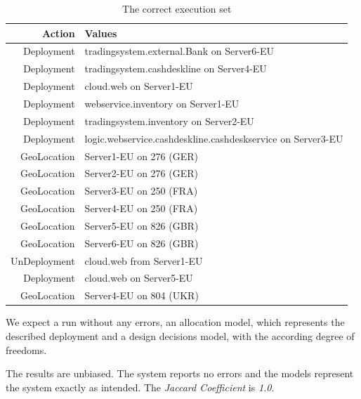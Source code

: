 \begin{table}[h]
	\centering
	\begin{tabular}{r | l}
		\hline
		\textbf{Action} & \textbf{Values}\\
		\hline
		Deployment & tradingsystem.external.Bank on Server6-EU\\
		Deployment & tradingsystem.cashdeskline on Server4-EU\\
		Deployment & cloud.web on Server1-EU\\
		Deployment & webservice.inventory on Server1-EU\\
		Deployment & tradingsystem.inventory on Server2-EU\\
		Deployment & logic.webservice.cashdeskline.cashdeskservice on Server3-EU\\
		GeoLocation & Server1-EU on 276 (GER)\\
		GeoLocation & Server2-EU on 276 (GER)\\
		GeoLocation & Server3-EU on 250 (FRA)\\
		GeoLocation & Server4-EU on 250 (FRA)\\
		GeoLocation & Server5-EU on 826 (GBR)\\
		GeoLocation & Server6-EU on 826 (GBR)\\
		UnDeployment & cloud.web from Server1-EU\\
		Deployment & cloud.web on Server5-EU\\
		GeoLocation & Server4-EU on 804 (UKR)\\
		\hline
		\end{tabular}
	\caption{The correct execution set}
	\label{tab:valid_run}
\end{table}

We expect a run without any errors, an allocation model, which represents the described deployment and a design decisions model, with the according degree of freedoms.

The results are unbiased. The system reports no errors and the models represent the system exactly as intended. The \textit{Jaccard Coefficient} is \textit{1.0}.

